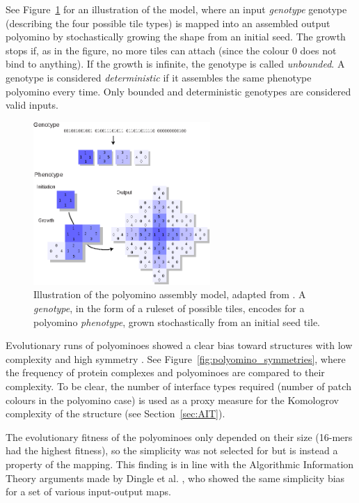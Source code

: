 See Figure~\ref{fig:polyominoes} for an illustration of the model, where an input \emph{genotype} genotype (describing the four possible tile types) is mapped into an assembled output polyomino by stochastically growing the shape from an initial seed. The growth stops if, as in the figure, no more tiles can attach (since the colour \(0\) does not bind to anything). If the growth is infinite, the genotype is called \emph{unbounded}. A genotype is considered \emph{deterministic} if it assembles the same phenotype polyomino every time. Only bounded and deterministic genotypes are considered valid inputs.

\begin{figure}[h]
    \centering
    \includegraphics[width=0.6\textwidth]{figures/polyominoes.eps}
    \caption{Illustration of the polyomino assembly model, adapted from \cite{johnston2011evolutionary}. A \emph{genotype}, in the form of a ruleset of possible tiles, encodes for a polyomino \emph{phenotype}, grown stochastically from an initial seed tile.}
    \label{fig:polyominoes}
\end{figure}

Evolutionary runs of polyominoes showed a clear bias toward structures with low complexity and high symmetry \cite{johnston2021}. See Figure~\ref{fig:polyomino_symmetries}, where the frequency of protein complexes and polyominoes are compared to their complexity. To be clear, the number of interface types required (number of patch colours in the polyomino case) is used as a proxy measure for the Komologrov complexity of the structure (see Section~\ref{sec:AIT}).

The evolutionary fitness of the polyominoes only depended on their size (16-mers had the highest fitness), so the simplicity was not selected for but is instead a property of the mapping. This finding is in line with the Algorithmic Information Theory arguments made by Dingle et al. \cite{dingle2018input}, who showed the same simplicity bias for a set of various input-output maps.

